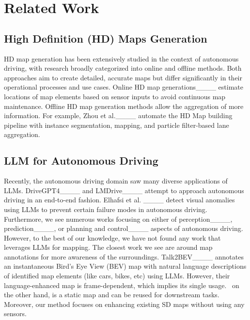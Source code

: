 \section{Related Work}
\label{related_work}
\subsection{High Definition (HD) Maps Generation}
HD map generation has been extensively studied in the context of autonomous
driving, with research broadly categorized into online and offline methods. Both
approaches aim to create detailed, accurate maps but differ significantly in
their operational processes and use cases. Online HD map
generations____ estimate locations of map elements based on sensor inputs to
avoid continuous map maintenance. Offline HD map generation methods allow the
aggregation of more information. For example, Zhou et
al.____ automate the HD Map building pipeline with instance
segmentation, mapping, and particle filter-based lane aggregation.

\subsection{LLM for Autonomous Driving}
Recently, the autonomous driving domain saw many diverse applications of LLMs.
DriveGPT4____ and LMDrive____ attempt to approach
autonomous driving in an end-to-end fashion. Elhafsi et al.
____ detect visual anomalies using LLMs to prevent certain
failure modes in autonomous driving. Furthermore, we see numerous works focusing
on either of perception____, prediction____,
or planning and control____ aspects of
autonomous driving. However, to the best of our knowledge, we have not found any
work that leverages LLMs for mapping. The closest work we see are around map
annotations for more awareness of the surroundings. Talk2BEV____
annotates an instantaneous Bird's Eye View (BEV) map with natural language
descriptions of identified map elements (like cars, bikes, etc) using LLMs.
However, their language-enhanced map is frame-dependent, which implies its
single usage. \our\ on the other hand, is a static map and can be reused for
downstream tasks. Moreover, our method focuses on enhancing existing SD maps
without using any sensors.

